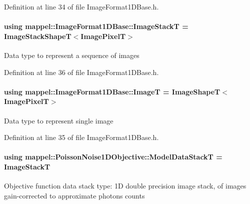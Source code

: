 Definition at line 34 of file Image\+Format1\+D\+Base.\+h.

\paragraph[{\texorpdfstring{Image\+StackT}{ImageStackT}}]{\setlength{\rightskip}{0pt plus 5cm}using {\bf mappel\+::\+Image\+Format1\+D\+Base\+::\+Image\+StackT} =  {\bf Image\+Stack\+ShapeT}$<${\bf Image\+PixelT}$>$\hspace{0.3cm}{\ttfamily [inherited]}}\hypertarget{classmappel_1_1ImageFormat1DBase_a81e3246d1c5c37ebf9077b7b5bd25a76}{}\label{classmappel_1_1ImageFormat1DBase_a81e3246d1c5c37ebf9077b7b5bd25a76}
Data type to represent a sequence of images 

Definition at line 36 of file Image\+Format1\+D\+Base.\+h.

\paragraph[{\texorpdfstring{ImageT}{ImageT}}]{\setlength{\rightskip}{0pt plus 5cm}using {\bf mappel\+::\+Image\+Format1\+D\+Base\+::\+ImageT} =  {\bf Image\+ShapeT}$<${\bf Image\+PixelT}$>$\hspace{0.3cm}{\ttfamily [inherited]}}\hypertarget{classmappel_1_1ImageFormat1DBase_a521a1ff391a52a636fac4aac7c7ba02c}{}\label{classmappel_1_1ImageFormat1DBase_a521a1ff391a52a636fac4aac7c7ba02c}
Data type to represent single image 

Definition at line 35 of file Image\+Format1\+D\+Base.\+h.

\paragraph[{\texorpdfstring{Model\+Data\+StackT}{ModelDataStackT}}]{\setlength{\rightskip}{0pt plus 5cm}using {\bf mappel\+::\+Poisson\+Noise1\+D\+Objective\+::\+Model\+Data\+StackT} =  {\bf Image\+StackT}\hspace{0.3cm}{\ttfamily [inherited]}}\hypertarget{classmappel_1_1PoissonNoise1DObjective_a62f5cb009e4c0e53fdfbf90b3153b94f}{}\label{classmappel_1_1PoissonNoise1DObjective_a62f5cb009e4c0e53fdfbf90b3153b94f}
Objective function data stack type\+: 1D double precision image stack, of images gain-\/corrected to approximate photons counts 

